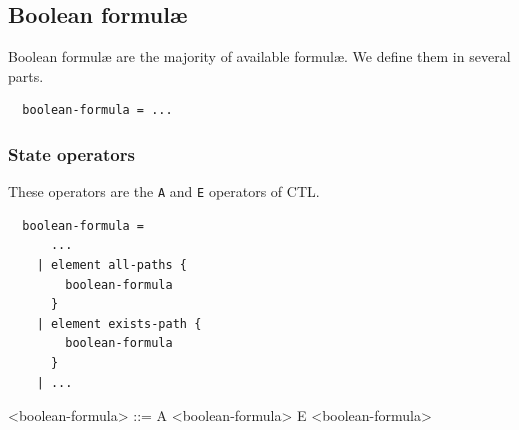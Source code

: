 \documentclass[10pt,english,a4paper]{article}
\begin{document}
\subsection{Boolean formul{\ae}}

Boolean formul{\ae} are the majority of available formul{\ae}.
We define them in several parts.

\begin{lstlisting}
  boolean-formula = ...
\end{lstlisting}




\subsubsection{State operators}

These operators are the \lstinline!A! and \lstinline!E! operators of CTL.

\begin{multicols}{2}
\begin{lstlisting}
  boolean-formula =
      ...
    | element all-paths {
        boolean-formula
      }
    | element exists-path {
        boolean-formula
      }
    | ...
\end{lstlisting}
\columnbreak
\scriptsize
\scriptsize\begin{grammar}
<boolean-formula> ::= A <boolean-formula>
\alt E <boolean-formula>
\end{grammar}
\end{multicols}
\end{document}
